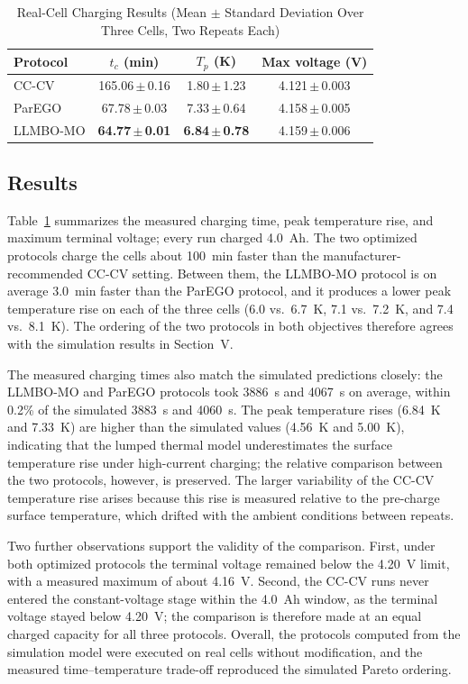 \documentclass[journal]{IEEEtran}
\begin{document}
\begin{table}[!t]
\caption{Real-Cell Charging Results (Mean $\pm$ Standard Deviation Over
Three Cells, Two Repeats Each)}
\label{tab:realcell_results}
\centering
\begin{tabular}{lccc}
\toprule
Protocol & $t_c$ (min) & $T_p$ (K) & Max voltage (V) \\
\midrule
CC-CV & 165.06\,$\pm$\,0.16 & 1.80\,$\pm$\,1.23 & 4.121\,$\pm$\,0.003 \\
ParEGO & 67.78\,$\pm$\,0.03 & 7.33\,$\pm$\,0.64 & 4.158\,$\pm$\,0.005 \\
LLMBO-MO & \textbf{64.77\,$\pm$\,0.01} & \textbf{6.84\,$\pm$\,0.78} & 4.159\,$\pm$\,0.006 \\
\bottomrule
\end{tabular}
\end{table}

\subsection{Results}

Table~\ref{tab:realcell_results} summarizes the measured charging time,
peak temperature rise, and maximum terminal voltage; every run charged
4.0~Ah. The two optimized protocols charge the cells about 100~min faster
than the manufacturer-recommended CC-CV setting. Between them, the
LLMBO-MO protocol is on average 3.0~min faster than the ParEGO protocol,
and it produces a lower peak temperature rise on each of the three cells
(6.0 vs.\ 6.7~K, 7.1 vs.\ 7.2~K, and 7.4 vs.\ 8.1~K). The ordering of the
two protocols in both objectives therefore agrees with the simulation
results in Section~V.

The measured charging times also match the simulated predictions closely:
the LLMBO-MO and ParEGO protocols took 3886~s and 4067~s on average,
within 0.2\% of the simulated 3883~s and 4060~s. The peak temperature
rises (6.84~K and 7.33~K) are higher than the simulated values (4.56~K and
5.00~K), indicating that the lumped thermal model underestimates the
surface temperature rise under high-current charging; the relative
comparison between the two protocols, however, is preserved. The larger
variability of the CC-CV temperature rise arises because this rise is
measured relative to the pre-charge surface temperature, which drifted
with the ambient conditions between repeats.

Two further observations support the validity of the comparison. First,
under both optimized protocols the terminal voltage remained below the
4.20~V limit, with a measured maximum of about 4.16~V. Second, the CC-CV
runs never entered the constant-voltage stage within the 4.0~Ah window, as
the terminal voltage stayed below 4.20~V; the comparison is therefore made
at an equal charged capacity for all three protocols. Overall, the
protocols computed from the simulation model were executed on real cells
without modification, and the measured time--temperature trade-off
reproduced the simulated Pareto ordering.
\end{document}
